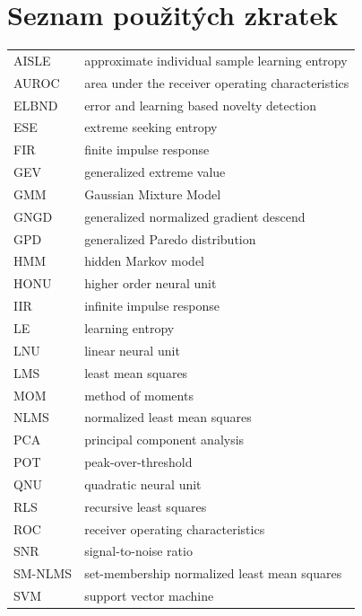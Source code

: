 \chapter*{Seznam použitých zkratek}
\begin{tabular}{ll}
AISLE					& approximate individual sample learning entropy \\
AUROC					& area under the receiver operating characteristics\\
ELBND                   & error and learning based novelty detection      \\
ESE                     & extreme seeking entropy                         \\
FIR						& finite impulse response \\
GEV                     & generalized extreme value                       \\
GMM						& Gaussian Mixture Model \\
GNGD                    & generalized normalized gradient descend         \\
GPD						& generalized Paredo distribution \\
HMM						& hidden Markov model \\
HONU					& higher order neural unit \\
IIR						& infinite impulse response \\
LE                      & learning entropy                              \\
LNU                     & linear neural unit                              \\
LMS						& least mean squares							\\
MOM						& method of moments \\
NLMS                    & normalized least mean squares                   \\
PCA						& principal component analysis \\
POT                     & peak-over-threshold                             \\
QNU                     & quadratic neural unit                           \\
RLS                     & recursive least squares                         \\
ROC						& receiver operating characteristics \\
SNR                     & signal-to-noise ratio                           \\
SM-NLMS                 & set-membership normalized least mean squares \\
SVM						& support vector machine \\



\end{tabular}


